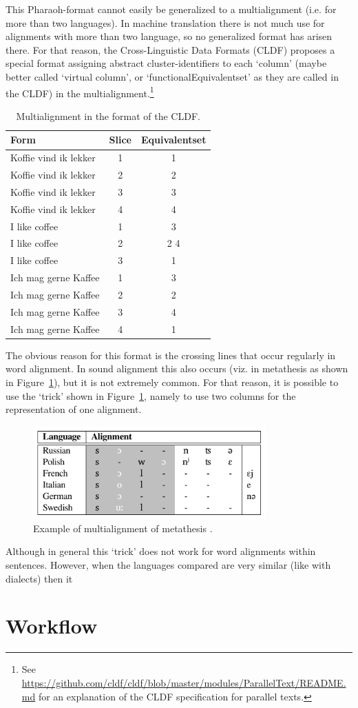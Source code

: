\documentclass[11pt]{article}
\begin{document}
This Pharaoh-format cannot easily be generalized to a multialignment (i.e. for more than two languages). In machine translation there is not much use for alignments with more than two language, so no generalized format has arisen there. For that reason, the Cross-Linguistic Data Formats (CLDF) proposes a special format assigning  abstract cluster-identifiers to each `column' (maybe better called `virtual column', or `functionalEquivalentset' as they are called in the CLDF) in the multialignment.\footnote{See \url{https://github.com/cldf/cldf/blob/master/modules/ParallelText/README.md} for an explanation of the CLDF specification for parallel texts.}

\begin{table}[htp]
\centering
\begin{tabular}{ l c c }            \hline
 Form & Slice & Equivalentset    \\ \hline
 Koffie vind ik lekker & 1 & 1   \\
 Koffie vind ik lekker & 2 & 2   \\
 Koffie vind ik lekker & 3 & 3   \\
 Koffie vind ik lekker & 4 & 4   \\ \hline
 I like coffee         & 1 & 3   \\
 I like coffee         & 2 & 2 4 \\
 I like coffee         & 3 & 1   \\ \hline
 Ich mag gerne Kaffee  & 1 & 3   \\
 Ich mag gerne Kaffee  & 2 & 2   \\
 Ich mag gerne Kaffee  & 3 & 4   \\
 Ich mag gerne Kaffee  & 4 & 1   \\ \hline
\end{tabular}
\caption{Multialignment in the format of the CLDF.}
\label{tab:cldf_paralleltext}
\end{table}

The obvious reason for this format is the crossing lines that occur regularly in word alignment. In sound alignment this also occurs (viz. in metathesis as shown in Figure~\ref{fig:metathesis_list}), but it is not extremely common. For that reason, it is possible to use the `trick' shown in Figure~\ref{fig:metathesis_list}, namely to use two columns for the representation of one alignment.

\begin{figure}[htbp]
  \centering
  \includegraphics[width=0.8\textwidth]{images/metathesis_list.pdf}
  \caption{Example of multialignment of metathesis \parencite[135]{list2014}.}
  \label{fig:metathesis_list}
\end{figure}

Although in general this `trick' does not work for word alignments within sentences. However, when the languages compared are very similar (like with dialects) then it 

\section{Workflow}

\printbibliography
\end{document}
